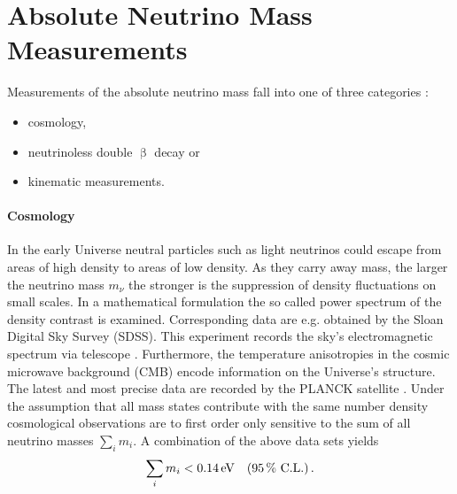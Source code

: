     \section{Absolute Neutrino Mass Measurements}
    \label{sec:absoluteNuMassMeasurement}
    Measurements of the absolute neutrino mass fall into one of three categories \cite{Otten:2008zz}:
    \begin{itemize}
        \renewcommand{\labelitemi}{$\bullet$}
        \item cosmology,
        \item neutrinoless double $\upbeta$ decay or
        \item kinematic measurements.
    \end{itemize}
    \paragraph{Cosmology}
    In the early Universe neutral particles such as light neutrinos could escape from areas of high density to areas of low density. As they carry away mass, the larger the neutrino mass $m_\nu$ the stronger is the suppression of density fluctuations on small scales. In a mathematical formulation the so called power spectrum of the density contrast is examined. Corresponding data are e.g. obtained by the Sloan Digital Sky Survey (SDSS). This experiment records the sky's electromagnetic spectrum via telescope \cite{Doroshkevich2004}. Furthermore, the temperature anisotropies in the cosmic microwave background (CMB) encode information on the Universe's structure. The latest and most precise data are recorded by the PLANCK satellite \cite{Aghanim:2018}. Under the assumption that all mass states contribute with the same number density cosmological observations are to first order only sensitive to the sum of all neutrino masses $\sum_{i} m_i$. A combination of the above data sets yields \cite{Yeche:2017upn}
    \begin{equation*}
        \sum_i m_i < \SI{0.14}{eV} \quad (\SI{95}{\percent} \text{ C.L.}) \text{\,.}
    \end{equation*}
    
